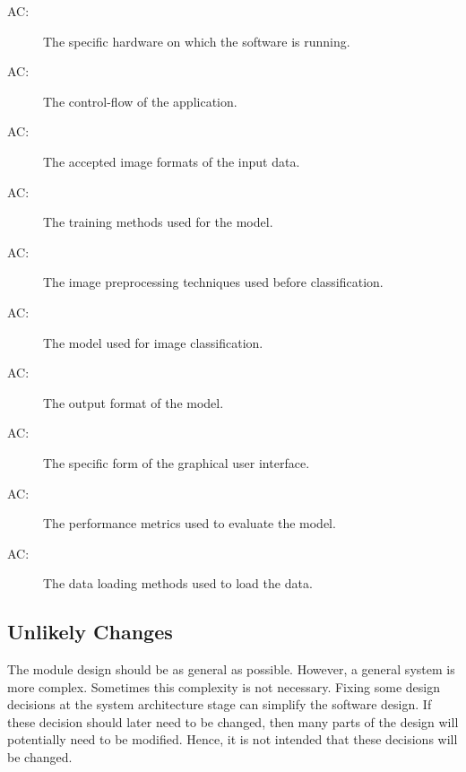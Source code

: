 \documentclass[12pt, titlepage]{article}
\newcounter{acnum}
\newcommand{\actheacnum}{AC\theacnum}
\begin{document}
\begin{description}
\item[ \actheacnum \label{acHardware}:] The specific
hardware on which the software is running.
\item[ \actheacnum \label{acApplication}:] The
control-flow of the application.
\item[ \actheacnum \label{acInput}:] The accepted image
formats of the input data.
\item[ \actheacnum \label{acTraining}:] The training
methods used for the model.
\item[ \actheacnum \label{acPreprocessing}:] The image
preprocessing techniques used before classification.
\item[ \actheacnum \label{acModel}:] The model used for
image classification.
\item[ \actheacnum \label{acOutput}:] The output format of
the model.
\item[ \actheacnum \label{acGUI}:] The specific form of
the graphical user interface.
\item[ \actheacnum \label{acPerformance}:] The performance
metrics used to evaluate the model.
\item[ \actheacnum \label{acData}:] The data loading
methods used to load the data.
\end{description}


\subsection{Unlikely Changes} \label{SecUchange}

The module design should be as general as possible. However, a general system is
more complex. Sometimes this complexity is not necessary. Fixing some design
decisions at the system architecture stage can simplify the software design. If
these decision should later need to be changed, then many parts of the design
will potentially need to be modified. Hence, it is not intended that these
decisions will be changed.
\end{document}
